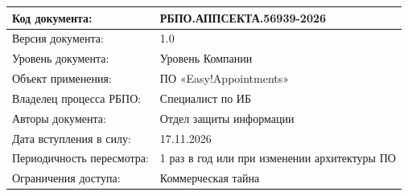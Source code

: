\newpage
\setcounter{page}{2}
\noindent
\begin{center}
    \begin{tabularx}{\textwidth}{|X|X|}
        \hline
        Код документа: & РБПО.АППСЕКТА.56939-2026 \\ \hline
        Версия документа: & 1.0 \\ \hline
        Уровень документа: & Уровень Компании \\ \hline
        Объект применения: & ПО «Easy!Appointments» \\ \hline
        Владелец процесса РБПО: & Специалист по ИБ \\ \hline
        Авторы документа: & Отдел защиты информации \\ \hline
        Дата вступления в силу: & 17.11.2026 \\ \hline
        Периодичность пересмотра: & 1 раз в год или при изменении архитектуры ПО \\ \hline
        Ограничения доступа: & Коммерческая тайна \\ \hline
    \end{tabularx}
\end{center}